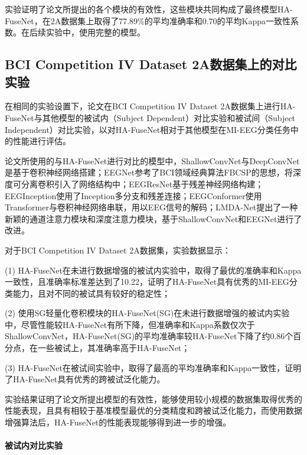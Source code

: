 实验证明了论文所提出的各个模块的有效性，这些模块共同构成了最终模型HA-FuseNet，在2A数据集上取得了77.89\%的平均准确率和0.70的平均Kappa一致性系数。在后续实验中，使用完整的模型。

\subsection{BCI Competition IV Dataset 2A数据集上的对比实验}

在相同的实验设置下，论文在BCI Competition IV Dataset 2A数据集上进行HA-FuseNet与其他模型的被试内（Subject Dependent）对比实验和被试间（Subject Independent）对比实验，以对HA-FuseNet相对于其他模型在MI-EEG分类任务中的性能进行评估。

论文所使用的与HA-FuseNet进行对比的模型中，ShallowConvNet\cite{schirrmeister2017deep}与DeepConvNet\cite{schirrmeister2017deep}是基于卷积神经网络搭建；EEGNet\cite{lawhern2018eegnet}参考了BCI领域经典算法FBCSP的思想，将深度可分离卷积引入了网络结构中；EEGResNet\cite{HBM:HBM23730}基于残差神经网络\cite{he2016deep}构建；EEGInception\cite{zhang2021eeg}使用了Inception多分支和残差连接；EEGConformer\cite{song2022eeg}使用Transformer\cite{vaswani2017attention}与卷积神经网络串联，用以EEG信号的解码；LMDA-Net\cite{miao2023lmda}提出了一种新颖的通道注意力模块和深度注意力模块，基于ShallowConvNet和EEGNet进行了改进。

对于BCI Competition IV Dataset 2A数据集，实验数据显示：

(1) HA-FuseNet在未进行数据增强的被试内实验中，取得了最优的准确率和Kappa一致性，且准确率标准差达到了10.22，证明了HA-FuseNet具有优秀的MI-EEG分类能力，且对不同的被试具有较好的稳定性；

(2) 使用SG轻量化卷积模块的HA-FuseNet(SG)在未进行数据增强的被试内实验中，尽管性能较HA-FuseNet有所下降，但准确率和Kappa系数仅次于ShallowConvNet，HA-FuseNet(SG)的平均准确率较HA-FuseNet下降了约0.86个百分点，在一些被试上，其准确率高于HA-FuseNet；

(3) HA-FuseNet在被试间实验中，取得了最高的平均准确率和Kappa一致性，证明了HA-FuseNet具有优秀的跨被试泛化能力。

实验结果证明了论文所提出模型的有效性，能够使用较小规模的数据集取得优秀的性能表现，且具有相较于基准模型最优的分类精度和跨被试泛化能力，而使用数据增强算法后，HA-FuseNet的性能表现能够得到进一步的增强。

\paragraph{被试内对比实验}

